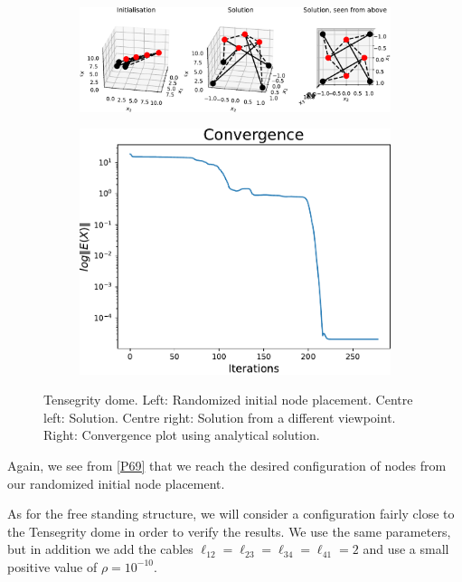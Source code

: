 \begin{figure}[!ht]
\centering
\begin{subfigure}{.72\textwidth}
  \centering
  \includegraphics[width=0.99\linewidth]{Bilder/P69.pdf}
\end{subfigure}%
\begin{subfigure}{.3\textwidth}
  \centering
  \includegraphics[width=0.99\linewidth]{Bilder/P69conv.pdf}
\end{subfigure}
\caption{Tensegrity dome. Left: Randomized initial node placement. Centre left: Solution. Centre right: Solution from a different viewpoint. Right: Convergence plot using analytical solution.}
\label{P69}
\end{figure}

Again, we see from \eqref{P69} that we reach the desired configuration of nodes from our randomized initial node placement. 


As for the free standing structure, we will consider a configuration fairly close to the Tensegrity dome in order to verify the results. We use the same parameters, but in addition we add the cables 
$\ell_{12} = \ell_{23} = \ell_{34} = \ell_{41} = 2 $ and use a small positive value of $\rho = 10^{-10}$.

